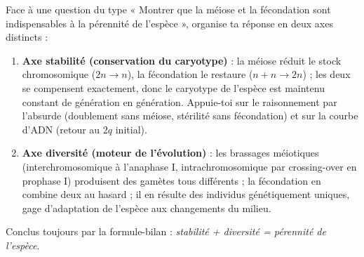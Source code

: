 \documentclass[11pt]{article}
\begin{document}
\begin{methode}
Face à une question du type « Montrer que la méiose et la fécondation sont indispensables à la pérennité de l'espèce », organise ta réponse en deux axes distincts :
\begin{enumerate}
\item \textbf{Axe stabilité (conservation du caryotype)} : la méiose réduit le stock chromosomique ($2n \rightarrow n$), la fécondation le restaure ($n + n \rightarrow 2n$) ; les deux se compensent exactement, donc le caryotype de l'espèce est maintenu constant de génération en génération. Appuie-toi sur le raisonnement par l'absurde (doublement sans méiose, stérilité sans fécondation) et sur la courbe d'ADN (retour au $2q$ initial).
\item \textbf{Axe diversité (moteur de l'évolution)} : les brassages méiotiques (interchromosomique à l'anaphase I, intrachromosomique par crossing-over en prophase I) produisent des gamètes tous différents ; la fécondation en combine deux au hasard ; il en résulte des individus génétiquement uniques, gage d'adaptation de l'espèce aux changements du milieu.
\end{enumerate}
Conclus toujours par la formule-bilan : \emph{stabilité + diversité = pérennité de l'espèce}.
\end{methode}
\end{document}
